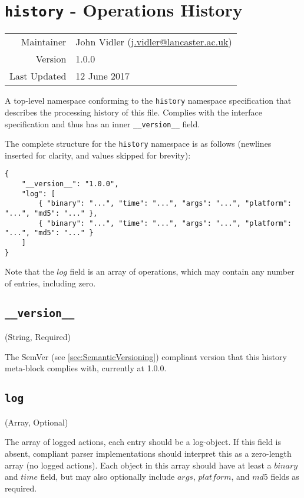 \section{\texttt{history} - Operations History}

\begin{tabular}{r|l}
    Maintainer & John Vidler (\href{mailto:j.vidler@lancaster.ac.uk}{j.vidler@lancaster.ac.uk}) \\
    Version & 1.0.0 \\
    Last Updated & 12 June 2017 \\
\end{tabular} \vspace{1em}

A top-level namespace conforming to the \texttt{history} namespace specification that describes the processing history of this file. Complies with the interface specification and thus has an inner \texttt{\_\_version\_\_} field.

The complete structure for the \texttt{history} namespace is as follows (newlines inserted for clarity, and values skipped for brevity):

\begin{lstlisting}
{
    "__version__": "1.0.0",
    "log": [
        { "binary": "...", "time": "...", "args": "...", "platform": "...", "md5": "..." },
        { "binary": "...", "time": "...", "args": "...", "platform": "...", "md5": "..." }
    ]
}
\end{lstlisting}

Note that the $log$ field is an array of operations, which may contain any number of entries, including zero.


\subsection{\texttt{\_\_version\_\_}}
(String, Required)

The SemVer (see \ref{sec:SemanticVersioning}) compliant version that this history meta-block complies with, currently at 1.0.0.


\subsection{\texttt{log}}
(Array, Optional)

The array of logged actions, each entry should be a log-object.
If this field is absent, compliant parser implementations should interpret this as a zero-length array (no logged actions).
Each object in this array should have at least a $binary$ and $time$ field, but may also optionally include $args$, $platform$, and $md5$ fields as required.

